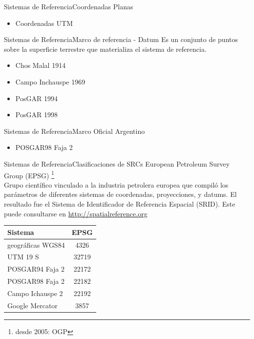 \documentclass{beamer}
\begin{document}
\begin{frame}{Sistemas de Referencia}{Coordenadas Planas}
		\begin{itemize}
			\item Coordenadas UTM
		\end{itemize}
\end{frame}

\begin{frame}{Sistemas de Referencia}{Marco de referencia - Datum}
		Es un conjunto de puntos sobre la superficie terrestre que materializa el sistema de referencia.
		\begin{itemize}
			\item Chos Malal 1914
			\item Campo Inchauspe 1969
			\item PosGAR 1994
			\item PosGAR 1998
		\end{itemize}
\end{frame}

\begin{frame}{Sistemas de Referencia}{Marco Oficial Argentino}
			\begin{itemize}
				\item  POSGAR98 Faja 2
			\end{itemize}
\end{frame}

\begin{frame}{Sistemas de Referencia}{Clasificaciones de SRCs}
	European Petroleum Survey Group (EPSG) \footnote{desde 2005: OGP}\\
	
	Grupo científico vinculado a la industria petrolera europea que compiló los parámetros de diferentes sistemas de coordenadas, proyecciones, y datums.	El resultado fue el Sistema de Identificador de Referencia Espacial (SRID). Este puede consultarse en \url{http://spatialreference.org} 
\begin{table}[]
	\centering
	\begin{tabular}{l|c}
		\toprule
		Sistema           & EPSG  \\
		\midrule
		geográficas WGS84 & 4326  \\
		UTM 19 S          & 32719 \\
		POSGAR94 Faja 2   & 22172 \\
		POSGAR98 Faja 2   & 22182 \\
		Campo Ichauspe 2  & 22192 \\
		Google Mercator   & 3857 
		\bottomrule
	\end{tabular}
\end{table}	
\end{frame}
\end{document}
